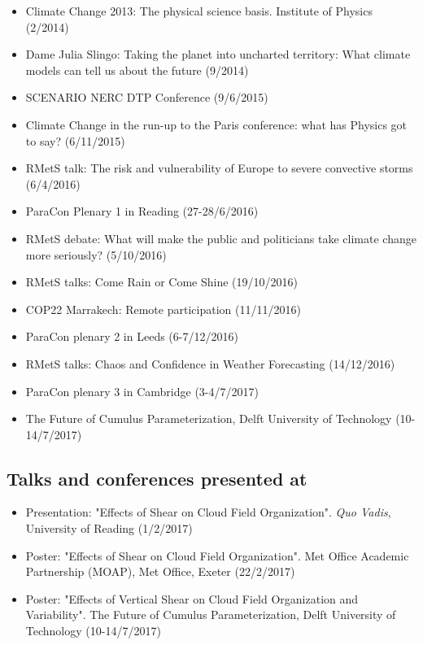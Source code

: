 \documentclass[11pt,a4paper]{article}
\begin{document}
\begin{itemize}
  \item Climate Change 2013: The physical science basis. Institute of Physics (2/2014)
  \item Dame Julia Slingo: Taking the planet into uncharted territory: What climate models can tell us about the future (9/2014)
  \item SCENARIO NERC DTP Conference (9/6/2015)
  \item Climate Change in the run-up to the Paris conference: what has Physics got to say? (6/11/2015)
  \item RMetS talk: The risk and vulnerability of Europe to severe convective storms (6/4/2016)
  \item ParaCon Plenary 1 in Reading (27-28/6/2016)
  \item RMetS debate: What will make the public and politicians take climate change more seriously? (5/10/2016)
  \item RMetS talks: Come Rain or Come Shine (19/10/2016)
  \item COP22 Marrakech: Remote participation (11/11/2016)
  \item ParaCon plenary 2 in Leeds (6-7/12/2016)
  \item RMetS talks: Chaos and Confidence in Weather Forecasting (14/12/2016)
  \item ParaCon plenary 3 in Cambridge (3-4/7/2017)
  \item The Future of Cumulus Parameterization, Delft University of Technology (10-14/7/2017)
\end{itemize}

\subsection*{Talks and conferences presented at}

\begin{itemize}
  \item Presentation: "Effects of Shear on Cloud Field Organization". \textit{Quo Vadis}, University of Reading (1/2/2017)
  \item Poster: "Effects of Shear on Cloud Field Organization". Met Office Academic Partnership (MOAP), Met Office, Exeter (22/2/2017)
  \item Poster: "Effects of Vertical Shear on Cloud Field Organization and Variability". The Future of Cumulus Parameterization, Delft University of Technology (10-14/7/2017)
\end{itemize}
\end{document}
